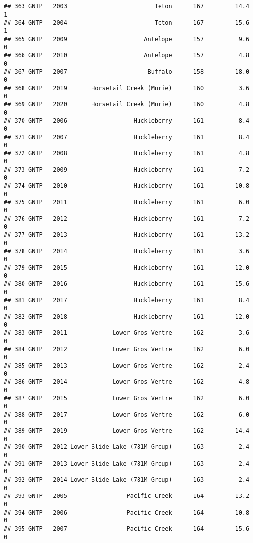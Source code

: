 \documentclass[
]{article}
\begin{document}
\begin{verbatim}
## 363 GNTP   2003                         Teton      167         14.4       1
## 364 GNTP   2004                         Teton      167         15.6       1
## 365 GNTP   2009                      Antelope      157          9.6       0
## 366 GNTP   2010                      Antelope      157          4.8       0
## 367 GNTP   2007                       Buffalo      158         18.0       0
## 368 GNTP   2019       Horsetail Creek (Murie)      160          3.6       0
## 369 GNTP   2020       Horsetail Creek (Murie)      160          4.8       0
## 370 GNTP   2006                   Huckleberry      161          8.4       0
## 371 GNTP   2007                   Huckleberry      161          8.4       0
## 372 GNTP   2008                   Huckleberry      161          4.8       0
## 373 GNTP   2009                   Huckleberry      161          7.2       0
## 374 GNTP   2010                   Huckleberry      161         10.8       0
## 375 GNTP   2011                   Huckleberry      161          6.0       0
## 376 GNTP   2012                   Huckleberry      161          7.2       0
## 377 GNTP   2013                   Huckleberry      161         13.2       0
## 378 GNTP   2014                   Huckleberry      161          3.6       0
## 379 GNTP   2015                   Huckleberry      161         12.0       0
## 380 GNTP   2016                   Huckleberry      161         15.6       0
## 381 GNTP   2017                   Huckleberry      161          8.4       0
## 382 GNTP   2018                   Huckleberry      161         12.0       0
## 383 GNTP   2011             Lower Gros Ventre      162          3.6       0
## 384 GNTP   2012             Lower Gros Ventre      162          6.0       0
## 385 GNTP   2013             Lower Gros Ventre      162          2.4       0
## 386 GNTP   2014             Lower Gros Ventre      162          4.8       0
## 387 GNTP   2015             Lower Gros Ventre      162          6.0       0
## 388 GNTP   2017             Lower Gros Ventre      162          6.0       0
## 389 GNTP   2019             Lower Gros Ventre      162         14.4       0
## 390 GNTP   2012 Lower Slide Lake (781M Group)      163          2.4       0
## 391 GNTP   2013 Lower Slide Lake (781M Group)      163          2.4       0
## 392 GNTP   2014 Lower Slide Lake (781M Group)      163          2.4       0
## 393 GNTP   2005                 Pacific Creek      164         13.2       0
## 394 GNTP   2006                 Pacific Creek      164         10.8       0
## 395 GNTP   2007                 Pacific Creek      164         15.6       0

\end{verbatim}
\end{document}
